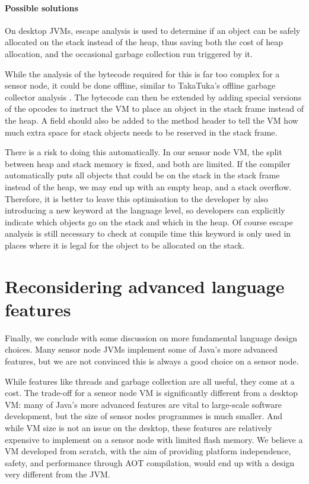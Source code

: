 \paragraph{Possible solutions}
On desktop JVMs, escape analysis \cite{Choi:1999uw, Goetz:2005uy} is used to determine if an object can be safely allocated on the stack instead of the heap, thus saving both the cost of heap allocation, and the occasional garbage collection run triggered by it.

While the analysis of the bytecode required for this is far too complex for a sensor node, it could be done offline, similar to TakaTuka's offline garbage collector analysis \cite{Aslam:2011thesis}. The bytecode can then be extended by adding special versions of the  opcodes to instruct the VM to place an object in the stack frame instead of the heap. A field should also be added to the method header to tell the VM how much extra space for stack objects needs to be reserved in the stack frame.

There is a risk to doing this automatically. In our sensor node VM, the split between heap and stack memory is fixed, and both are limited. If the compiler automatically puts all objects that could be on the stack in the stack frame instead of the heap, we may end up with an empty heap, and a stack overflow. Therefore, it is better to leave this optimisation to the developer by also introducing a new keyword at the language level, so developers can explicitly indicate which objects go on the stack and which in the heap. Of course escape analysis is still necessary to check at compile time this keyword is only used in places where it is legal for the object to be allocated on the stack.




\section{Reconsidering advanced language features}
\label{sec-advanced-features}
Finally, we conclude with some discussion on more fundamental language design choices. Many sensor node JVMs implement some of Java's more advanced features, but we are not convinced this is always a good choice on a sensor node.

While features like threads and garbage collection are all useful, they come at a cost. The trade-off for a sensor node VM is significantly different from a desktop VM: many of Java's more advanced features are vital to large-scale software development, but the size of sensor nodes programmes is much smaller. And while VM size is not an issue on the desktop, these features are relatively expensive to implement on a sensor node with limited flash memory. We believe a VM developed from scratch, with the aim of providing platform independence, safety, and performance through AOT compilation, would end up with a design very different from the JVM.

